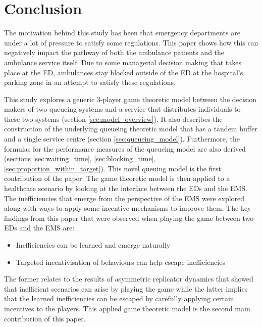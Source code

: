 \section{Conclusion}

The motivation behind this study has been that emergency departments are 
under a lot of pressure to satisfy some regulations. 
This paper shows how this can negatively impact the pathway of both the 
ambulance patients and the ambulance service itself.
Due to some managerial decision making that takes place at the ED, ambulances 
stay blocked outside of the ED at the hospital's parking zone in an attempt
to satisfy these regulations.

This study explores a generic 3-player game theoretic model between the 
decision makers of two queueing systems and a service that distributes 
individuals to these two systems (section \ref{sec:model_overview}).
It also describes the construction of the underlying queueing theoretic model 
that has a tandem buffer and a single service centre (section 
\ref{sec:queueing_model}).
Furthermore, the formulas for the performance measures of the queueing model 
are also derived (sections \ref{sec:waiting_time}, \ref{sec:blocking_time}, 
\ref{sec:proportion_within_target}). 
This novel queuing model is the first contribution of the paper.
The game theoretic model is then applied to a healthcare scenario by looking at
the interface between the EDs and the EMS.
The inefficiencies that emerge from the perspective of the EMS were explored 
along with ways to apply some incentive mechanisms to improve them.
The key findings from this paper that were observed when playing the game
between two EDs and the EMS are:
\begin{itemize}
    \item Inefficiencies can be learned and emerge naturally
    \item Targeted incentivisation of behaviours can help escape inefficiencies
\end{itemize}
The former relates to the results of asymmetric replicator dynamics that showed 
that inefficient scenarios can arise by playing the game while the latter 
implies that the learned inefficiencies can be escaped by carefully applying 
certain incentives to the players.
This applied game theoretic model is the second main contribution of this paper.

